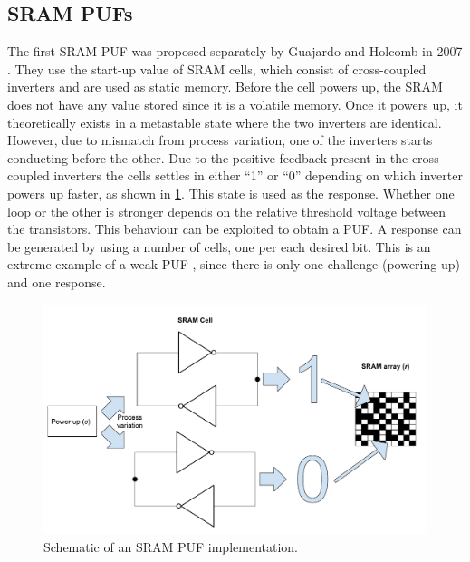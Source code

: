 \subsection{SRAM PUFs}
\label{ss:cap2SRAM}
The first SRAM PUF was proposed separately by Guajardo and Holcomb in 2007 \cite{Guajarado_og,Holcomb2007InitialSS}. They use the start-up value of SRAM cells, which consist of cross-coupled inverters and are used as static memory. Before the cell powers up, the SRAM does not have any value stored since it is a volatile memory. Once it powers up, it theoretically exists in a metastable state where the two inverters are identical. However, due to mismatch from process variation, one of the inverters starts conducting before the other. Due to the positive feedback present in the cross-coupled inverters the cells settles in either ``1'' or ``0'' depending on which inverter powers up faster, as shown in \ref{fig:SRAM_PUF}. This state is used as the response. Whether one loop or the other is stronger depends on the relative threshold voltage between the transistors. This behaviour can be exploited to obtain a PUF. A response can be generated by using a number of cells, one per each desired bit. This is an extreme example of a weak PUF , since there is only one challenge (powering up) and one response. 

\begin{figure}[H]
    \centering
    \includegraphics[width=14cm]{images/SRAM PUF implementation.pdf}
    \caption{Schematic of an SRAM PUF implementation.}
    \label{fig:SRAM_PUF}
\end{figure}


